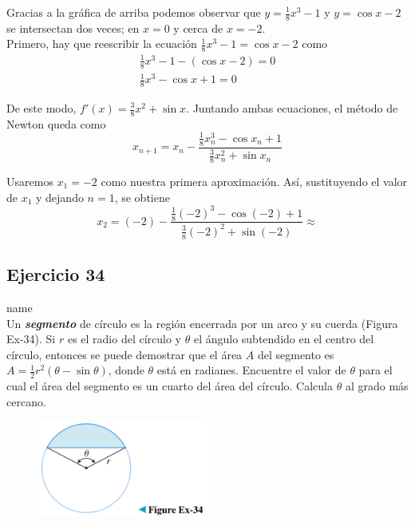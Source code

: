 \documentclass[12pt]{article}
\begin{document}
Gracias a la gráfica de arriba podemos observar que $y=\frac{1}{8}x^3-1$ y $y=\cos{x}-2$ se intersectan  dos veces; en $x = 0$ y cerca de $x =-2$. \\

Primero, hay que reescribir la ecuación $\frac{1}{8}x^3-1=\cos{x}-2$ como
\begin{align*}
  \frac{1}{8}x^3-1-(\cos{x}-2)=0 \\
  \frac{1}{8}x^3-\cos{x}+1=0 
\end{align*}

De este modo, $f'(x)=\frac{3}{8}x^2+\sin{x}$. Juntando ambas ecuaciones, el método de Newton queda como
\[
x_{n+1} = x_n-\frac{\frac{1}{8}x_n^3-\cos{x_n}+1}{\frac{3}{8}x_n^2+\sin{x_n}}
\]

Usaremos $x_1=-2$ como nuestra primera aproximación. Así, sustituyendo el valor de $x_1$ y dejando $n = 1$, se obtiene
\[
x_2 = (-2)-\frac{\frac{1}{8}(-2)^3-\cos{(-2)}+1}{\frac{3}{8}(-2)^2+\sin{(-2)}} \approx 
\]

\subsection{Ejercicio 34} name \\

Un \textit{\textbf{segmento}} de círculo es la región encerrada por un arco y su cuerda (Figura Ex-34). Si $r$ es el radio del círculo y $\theta$ el ángulo subtendido en el centro del círculo, entonces se puede demostrar que el área $A$ del segmento es $A = \frac{1}{2} r^2 (\theta - \sin{\theta})$, donde $\theta$ está en radianes. Encuentre el valor de $\theta$ para el cual el área del segmento es un cuarto del área del círculo. Calcula $\theta$ al grado más cercano.

\begin{figure}[H]
\centering
\includegraphics[width=0.5\textwidth]{../img/img_Lista3/3_34.png}
\end{figure}
\end{document}
